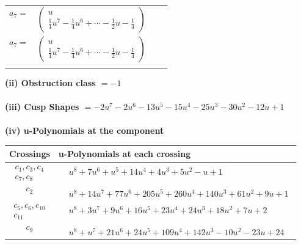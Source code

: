 \documentclass[1p]{elsarticle_modified}
\theoremstyle{definition}
\begin{document}
\begin{tabular}{m{7pt} m{180pt} m{7pt} m{180pt} }
\flushright $a_{7}=$&$\begin{pmatrix}u\\\frac{1}{4} u^7-\frac{1}{4} u^6+\cdots-\frac{1}{2} u-\frac{1}{4}\end{pmatrix}$\\ \flushright $a_{7}=$&$\begin{pmatrix}u\\\frac{1}{4} u^7-\frac{1}{4} u^6+\cdots-\frac{1}{2} u-\frac{1}{4}\end{pmatrix}$\\&\end{tabular}
\flushleft \textbf{(ii) Obstruction class $= -1$}\\~\\
\flushleft \textbf{(iii) Cusp Shapes $= -2 u^7-2 u^6-13 u^5-15 u^4-25 u^3-30 u^2-12 u+1$}\\~\\
\newpage\renewcommand{\arraystretch}{1}
\flushleft \textbf{(iv) u-Polynomials at the component}\newline \\
\begin{tabular}{m{50pt}|m{274pt}}
Crossings & \hspace{64pt}u-Polynomials at each crossing \\
\hline $$\begin{aligned}c_{1},c_{3},c_{4}\\c_{7},c_{8}\end{aligned}$$&$\begin{aligned}
&u^8+7 u^6+u^5+14 u^4+4 u^3+5 u^2- u+1
\end{aligned}$\\
\hline $$\begin{aligned}c_{2}\end{aligned}$$&$\begin{aligned}
&u^8+14 u^7+77 u^6+205 u^5+260 u^4+140 u^3+61 u^2+9 u+1
\end{aligned}$\\
\hline $$\begin{aligned}c_{5},c_{6},c_{10}\\c_{11}\end{aligned}$$&$\begin{aligned}
&u^8+3 u^7+9 u^6+16 u^5+23 u^4+24 u^3+18 u^2+7 u+2
\end{aligned}$\\
\hline $$\begin{aligned}c_{9}\end{aligned}$$&$\begin{aligned}
&u^8+u^7+21 u^6+24 u^5+109 u^4+142 u^3-10 u^2-23 u+24
\end{aligned}$\\
\hline
\end{tabular}\\~\\
\end{document}
